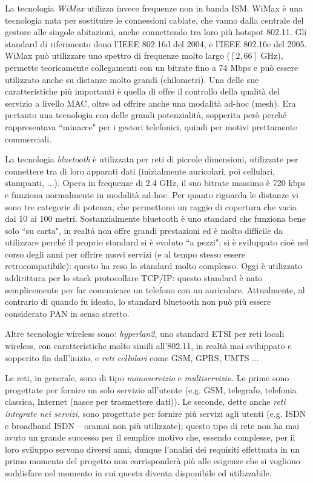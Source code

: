 La tecnologia \textit{WiMax} utilizza invece frequenze non in banda ISM. WiMax è una tecnologia nata per sostituire le connessioni cablate, che vanno dalla centrale del gestore alle singole abitazioni, anche connettendo tra loro più hotspot 802.11. Gli standard di riferimento dono l'IEEE 802.16d del 2004, e l'IEEE 802.16e del 2005. WiMax può utilizzare uno spettro di frequenze molto largo ($[2, 66]$ GHz), permette teoricamente collegamenti con un bitrate fino a 74 Mbps e può essere utilizzato anche su distanze molto grandi (chilometri). Una delle sue caratteristiche più importanti è quella di offre il controllo della qualità del servizio a livello MAC, oltre ad offrire anche una modalità ad-hoc (mesh). Era pertanto una tecnologia con delle grandi potenzialità, sopperita però perché rappresentava \textquotedblleft minacce" per i gestori telefonici, quindi per motivi prettamente commerciali.

La tecnologia \textit{bluetooth} è utilizzata per reti di piccole dimensioni, utilizzate per connettere tra di loro apparati dati (inizialmente auricolari, poi cellulari, stampanti, $\dots$). Opera in frequenze di 2.4 GHz, il suo bitrate massimo è 720 kbps e funziona normalmente in modalità ad-hoc. Per quanto riguarda le distanze vi sono tre categorie di potenza, che permettono un raggio di copertura che varia dai 10 ai 100 metri. Sostanzialmente bluetooth è uno standard che funziona bene solo \textquotedblleft su carta", in realtà non offre grandi prestazioni ed è molto difficile da utilizzare perché il proprio standard si è evoluto \textquotedblleft a pezzi"; si è sviluppato cioè nel corso degli anni per offrire nuovi servizi (e al tempo stesso essere retrocompatibile): questo ha reso lo standard molto complesso. Oggi è utilizzato addirittura per lo stack protocollare TCP/IP: questo standard è nato semplicemente per far comunicare un telefono con un auricolare. Attualmente, al contrario di quando fu ideato, lo standard bluetooth non può più essere considerato PAN in senso stretto.

Altre tecnologie wireless sono: \textit{hyperlan2}, uno standard ETSI per reti locali wireless, con caratteristiche molto simili all'802.11, in realtà mai sviluppato e sopperito fin dall'inizio, e \textit{reti cellulari} come GSM, GPRS, UMTS $\dots$

Le reti, in generale, sono di tipo \textit{monoservizio} e \textit{multiservizio}. Le prime sono progettate per fornire un solo servizio all'utente (e.g. GSM, telegrafo, telefonia classica, Internet (nasce per trasmettere dati)). Le seconde, dette anche \textit{reti integrate nei servizi}, sono progettate per fornire più servizi agli utenti (e.g. ISDN e broadband ISDN -- oramai non più utilizzate); questo tipo di rete non ha mai avuto un grande successo per il semplice motivo che, essendo complesse, per il loro sviluppo servono diversi anni, dunque l'analisi dei requisiti effettuata in un primo momento del progetto non corrisponderà più alle esigenze che si vogliono soddisfare nel momento in cui questa diventa disponibile ed utilizzabile.

